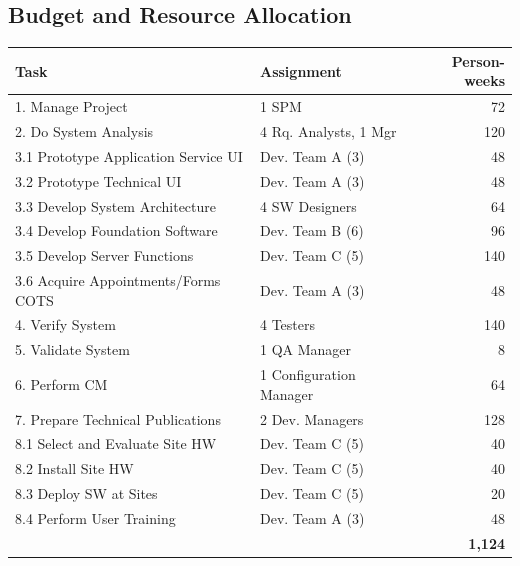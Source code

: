 \documentclass[11pt]{article}
\begin{document}
\subsection{Budget and Resource Allocation}

\begin{center}
  \begin{tabular}{l@{\hspace{1cm}}l@{\hspace{1cm}}r}
    \bf Task                             & \bf Assignment          & \bf Person-weeks \\
    \hline \hline
    1. Manage Project                    & 1 SPM                   & 72               \\
    2. Do System Analysis                & 4 Rq. Analysts, 1 Mgr   & 120              \\
    3.1 Prototype Application Service UI & Dev. Team A (3)         & 48               \\
    3.2 Prototype Technical UI           & Dev. Team A (3)         & 48               \\
    3.3 Develop System Architecture      & 4 SW Designers          & 64               \\
    3.4 Develop Foundation Software      & Dev. Team B (6)         & 96               \\
    3.5 Develop Server Functions         & Dev. Team C (5)         & 140              \\
    3.6 Acquire Appointments/Forms COTS  & Dev. Team A (3)         & 48               \\
    4. Verify System                     & 4 Testers               & 140              \\
    5. Validate System                   & 1 QA Manager            & 8                \\
    6. Perform CM                        & 1 Configuration Manager & 64               \\
    7. Prepare Technical Publications    & 2 Dev. Managers         & 128              \\
    8.1 Select and Evaluate Site HW      & Dev. Team C (5)         & 40               \\
    8.2 Install Site HW                  & Dev. Team C (5)         & 40               \\
    8.3 Deploy SW at Sites               & Dev. Team C (5)         & 20               \\
    8.4 Perform User Training            & Dev. Team A (3)         & 48               \\
    \hline
                                         &                         & \bf 1,124        \\
    \cline{3-3}
  \end{tabular}
\end{center}
\end{document}
